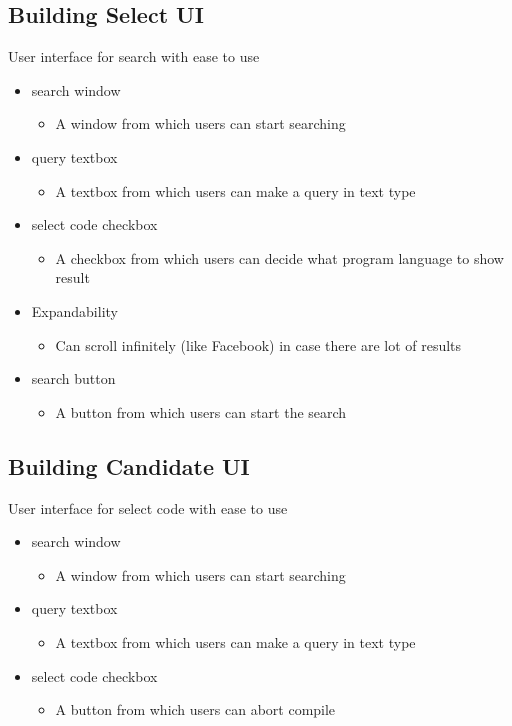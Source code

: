 \documentclass[conference]{IEEEtran}
\begin{document}
\begin{itemize}
\subsection{Building Select UI}
 User interface for search with ease to use

\begin{itemize}
  \item search window
  \begin{itemize}
    \item A window from which users can start searching
  \end{itemize}
  \item query textbox
  \begin{itemize}
    \item A textbox from which users can make a query in text type
  \end{itemize}
  \item select code checkbox
  \begin{itemize}
    \item A checkbox from which users can decide what program language to show result
  \end{itemize}
  \item Expandability   \begin{itemize}
    \item Can scroll infinitely (like Facebook) in case there are lot of results
  \end{itemize}
  \item search button   \begin{itemize}
    \item A button from which users can start the search
  \end{itemize}
\end{itemize}
\textit{ }


\subsection{Building Candidate UI}
 User interface for select code with ease to use


\begin{itemize}
  \item search window
  \begin{itemize}
    \item A window from which users can start searching
  \end{itemize}
  \item query textbox
  \begin{itemize}
    \item A textbox from which users can make a query in text type
  \end{itemize}
  \item select code checkbox
  \begin{itemize}
    \item A button from which users can abort compile
  \end{itemize}
\end{itemize}
\textit{ }



\end{itemize}
\end{document}
